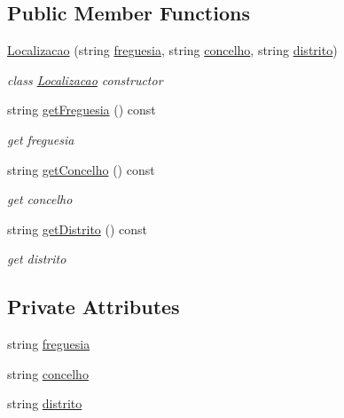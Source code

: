 \subsection*{Public Member Functions}
\begin{DoxyCompactItemize}
\item 
\hyperlink{class_localizacao_a51b1baf2780fca41bb72d2c007e8a413}{Localizacao} (string \hyperlink{class_localizacao_a0868f113b0469e97191d5039c058ab11}{freguesia}, string \hyperlink{class_localizacao_a9100e2c4be0b28690e04621376799466}{concelho}, string \hyperlink{class_localizacao_a43dc8b8277fca7702fba41119b965a04}{distrito})
\begin{DoxyCompactList}\small\item\em class \hyperlink{class_localizacao}{Localizacao} constructor \end{DoxyCompactList}\item 
string \hyperlink{class_localizacao_a053eb26ab5dbd5aa9e19ff956b23cfb8}{get\+Freguesia} () const 
\begin{DoxyCompactList}\small\item\em get freguesia \end{DoxyCompactList}\item 
string \hyperlink{class_localizacao_ac7b9550bf9cf246a542baa5c83836c16}{get\+Concelho} () const 
\begin{DoxyCompactList}\small\item\em get concelho \end{DoxyCompactList}\item 
string \hyperlink{class_localizacao_ada573976f8cc3c47ba02ef0dc35e7e9e}{get\+Distrito} () const 
\begin{DoxyCompactList}\small\item\em get distrito \end{DoxyCompactList}\end{DoxyCompactItemize}
\subsection*{Private Attributes}
\begin{DoxyCompactItemize}
\item 
string \hyperlink{class_localizacao_a0868f113b0469e97191d5039c058ab11}{freguesia}
\item 
string \hyperlink{class_localizacao_a9100e2c4be0b28690e04621376799466}{concelho}
\item 
string \hyperlink{class_localizacao_a43dc8b8277fca7702fba41119b965a04}{distrito}
\end{DoxyCompactItemize}
